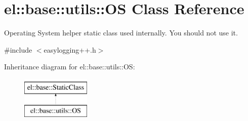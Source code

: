 \hypertarget{classel_1_1base_1_1utils_1_1OS}{\section{el\-:\-:base\-:\-:utils\-:\-:O\-S Class Reference}
\label{classel_1_1base_1_1utils_1_1OS}
}


Operating System helper static class used internally. You should not use it.  




{\ttfamily \#include $<$easylogging++.\-h$>$}

Inheritance diagram for el\-:\-:base\-:\-:utils\-:\-:O\-S\-:\begin{figure}[H]
\begin{center}
\leavevmode
\includegraphics[height=2.000000cm]{classel_1_1base_1_1utils_1_1OS}
\end{center}
\end{figure}
